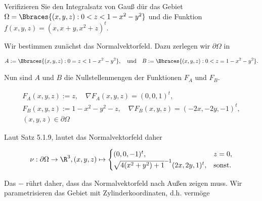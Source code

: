 
\begin{exercise}

Verifizieren Sie den Integralsatz von Gauß dür das Gebiet $\Omega = \Bbraces{(x, y, z): 0 < z < 1 - x^2 - y^2}$ und die Funktion $f(x, y, z) = (x, x + y, x^2 + z)^t$.

\end{exercise}


\begin{solution}

Wir bestimmen zunächst das Normalvektorfeld.
Dazu zerlegen wir $\partial \Omega$ in

\begin{align*}
    A := \Bbraces{(x, y, z): 0 = z < 1 - x^2 - y^2},
    \quad
    \text{und}
    \quad
    B := \Bbraces{(x, y, z): 0 < z = 1 - x^2 - y^2}.
\end{align*}

Nun sind $A$ und $B$ die Nullstellenmengen der Funktionen $F_A$ und $F_B$.

\begin{gather*}
    F_A(x, y, z) := z,
    \quad
    \nabla F_A(x, y, z) = (0, 0, 1)^t, \\
    F_B(x, y, z) := 1 - x^2 - y^2 - z,
    \quad
    \nabla F_B(x, y, z) = (-2 x, -2 y, -1)^t, \\
    (x, y, z) \in \partial \Omega
\end{gather*}


Laut Satz 5.1.9, lautet das Normalvektorfeld daher

\begin{align*}
    \nu:
        \partial \Omega \to \R^3,
        (x, y, z)
        \mapsto
        \begin{cases}
            (0, 0, -1)^t,                                  & z = 0, \\
            \sqrt{4 (x^2 + y^2) + 1}^{-1} (2 x, 2 y, 1)^t, & \text{sonst}.
        \end{cases}
\end{align*}

Das $-$ rührt daher, dass das Normalvektorfeld nach Außen zeigen muss.
Wir parametrisieren das Gebiet mit Zylinderkoordinaten, d.h. vermöge


\end{solution}
